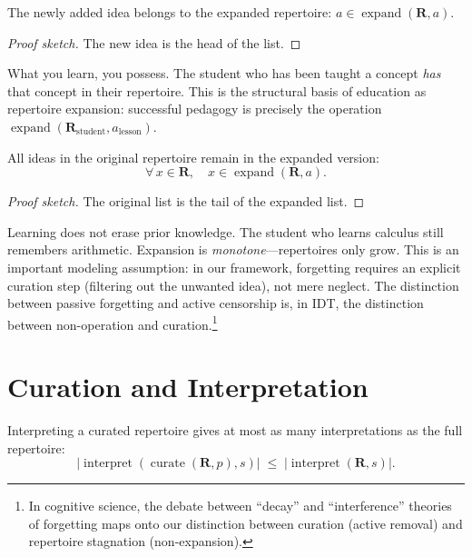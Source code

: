 \begin{theorem}
\label{thm:new-idea-mem}
The newly added idea belongs to the expanded repertoire:
$a \in \operatorname{expand}(\mathbf{R}, a)$.
\end{theorem}

\begin{proof}[Proof sketch]
The new idea is the head of the list.
\end{proof}

What you learn, you possess.  The student who has been taught a concept
\emph{has} that concept in their repertoire.  This is the structural basis
of education as repertoire expansion: successful pedagogy is precisely the
operation $\operatorname{expand}(\mathbf{R}_{\text{student}}, a_{\text{lesson}})$.

\begin{theorem}
\label{thm:old-survive}
All ideas in the original repertoire remain in the expanded version:
\[
  \forall\, x \in \mathbf{R},\quad x \in \operatorname{expand}(\mathbf{R}, a).
\]
\end{theorem}

\begin{proof}[Proof sketch]
The original list is the tail of the expanded list.
\end{proof}

Learning does not erase prior knowledge.  The student who learns calculus
still remembers arithmetic.  Expansion is \emph{monotone}---repertoires only
grow.  This is an important modeling assumption: in our framework, forgetting
requires an explicit curation step (filtering out the unwanted idea), not
mere neglect.  The distinction between passive forgetting and active
censorship is, in IDT, the distinction between non-operation and
curation.\footnote{In cognitive science, the debate between ``decay'' and
``interference'' theories of forgetting maps onto our distinction between
curation (active removal) and repertoire stagnation (non-expansion).}

\section{Curation and Interpretation}
\label{sec:ch15-curate-interp}

\begin{theorem}
\label{thm:curated-interp}
Interpreting a curated repertoire gives at most as many interpretations as
the full repertoire:
\[
  |\operatorname{interpret}(\operatorname{curate}(\mathbf{R}, p), s)|
  \;\le\;
  |\operatorname{interpret}(\mathbf{R}, s)|.
\]
\end{theorem}

